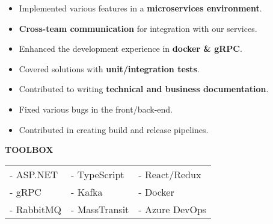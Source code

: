 \documentclass[10pt,a4paper,ragged2e]{altacv}
\begin{document}

\personalinfo{%
	
}

\begin{fullwidth}
	\makecvheader
\end{fullwidth}





\begin{itemize}
	\item Implemented various features in a \textbf{microservices environment}.
	\item \textbf{Cross-team communication} for integration with our services.
	\item Enhanced the development experience in \textbf{docker \& gRPC}.
	\item Covered solutions with \textbf{unit/integration tests}.
	\item Contributed to writing \textbf{technical and business documentation}.
	\item Fixed various bugs in the front/back-end.
	\item Contributed in creating build and release pipelines.
\end{itemize}

\smallskip
\textcolor{VividPurple}{\textbf{TOOLBOX}}
\medskip

\begin{tabular}{ l l l }
	- ASP.NET  & - TypeScript  & - React/Redux  \\
	- gRPC     & - Kafka       & - Docker       \\
	- RabbitMQ & - MassTransit & - Azure DevOps \\
\end{tabular}
\end{document}
